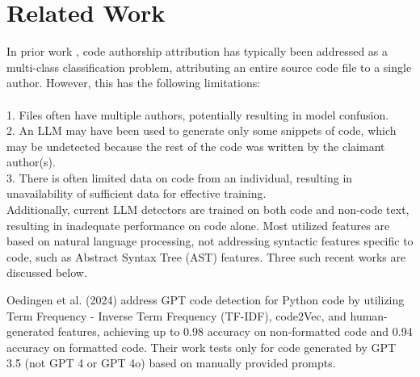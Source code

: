 \section{Related Work}
In prior work \citep{Y17, O21, C22, H22, A23}, code authorship attribution has typically been addressed as a multi-class classification problem, %
attributing an entire source code file to a single author. However, this has the following limitations:
\\\\ %
1. Files %
    often have multiple authors, potentially resulting in model confusion. 
\\    %
2. An LLM may have been used to generate only some snippets of code, which may be undetected because the rest of the code was written by the claimant author(s).
\\ 3. There is often limited data on %
    code from an individual, resulting in %
    unavailability of 
    sufficient data for effective training.\\ %


Additionally, current LLM detectors are trained on %
both code and non-code text, resulting in inadequate performance on code alone. %
Most utilized features are based on %
natural language processing, 
not addressing syntactic features specific to code, such as Abstract Syntax Tree (AST) features. %
Three such recent works are discussed below.


Oedingen et al. (2024)
address GPT code detection %
for Python code by utilizing Term Frequency - Inverse Term Frequency (TF-IDF), code2Vec, and human-generated features, %
achieving up to 0.98 accuracy on non-formatted code and 0.94 accuracy on formatted code. Their work %
tests %
only for code generated by GPT 3.5 (not GPT 4 or GPT 4o)
 based on manually provided %
 prompts.


